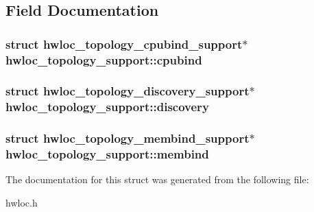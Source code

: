 \subsection{Field Documentation}
\hypertarget{a00026_adef2bb91f74c3e70a2a071393caf5f56}{
\subsubsection[{cpubind}]{\setlength{\rightskip}{0pt plus 5cm}struct {\bf hwloc\_\-topology\_\-cpubind\_\-support}$\ast$ {\bf hwloc\_\-topology\_\-support::cpubind}}}
\label{a00026_adef2bb91f74c3e70a2a071393caf5f56}
\hypertarget{a00026_aea3fbd7653d987d81f848636c420504d}{
\subsubsection[{discovery}]{\setlength{\rightskip}{0pt plus 5cm}struct {\bf hwloc\_\-topology\_\-discovery\_\-support}$\ast$ {\bf hwloc\_\-topology\_\-support::discovery}}}
\label{a00026_aea3fbd7653d987d81f848636c420504d}
\hypertarget{a00026_ac6eb62ae8bc0a68dce679a7107a36194}{
\subsubsection[{membind}]{\setlength{\rightskip}{0pt plus 5cm}struct {\bf hwloc\_\-topology\_\-membind\_\-support}$\ast$ {\bf hwloc\_\-topology\_\-support::membind}}}
\label{a00026_ac6eb62ae8bc0a68dce679a7107a36194}


The documentation for this struct was generated from the following file:\begin{DoxyCompactItemize}
\item 
hwloc.h\end{DoxyCompactItemize}
